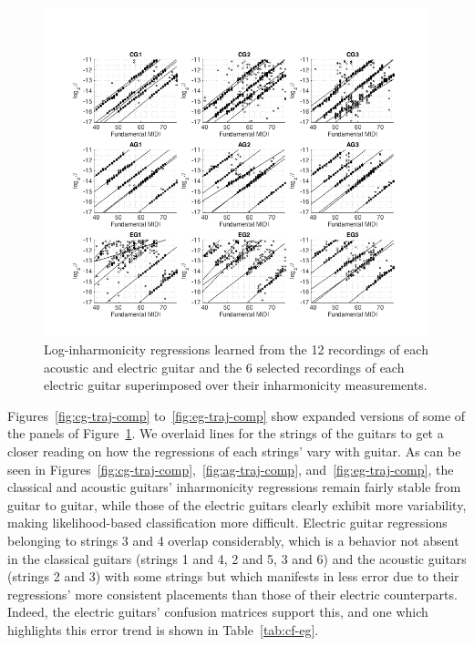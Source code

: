 \documentclass[12pt]{cmuthesis}
\begin{document}
\begin{figure}[!htbp] 
\centering
\includegraphics[scale=0.65]{regs3by3}
\caption{Log-inharmonicity regressions learned from the 12 recordings of each acoustic and electric guitar and the 6 selected recordings of each electric guitar superimposed over their inharmonicity measurements.}
\label{fig:regs3by3}
\end{figure}

Figures~\ref{fig:cg-traj-comp} to~\ref{fig:eg-traj-comp} show expanded versions of some of the panels of Figure~\ref{fig:regs3by3}. We overlaid lines for the strings of the guitars to get a closer reading on how the regressions of each strings' vary with guitar. As can be seen in Figures~\ref{fig:cg-traj-comp},~\ref{fig:ag-traj-comp}, and~\ref{fig:eg-traj-comp}, the classical and acoustic guitars' inharmonicity regressions remain fairly stable from guitar to guitar, while those of the electric guitars clearly exhibit more variability, making likelihood-based classification more difficult. Electric guitar regressions belonging to strings 3 and 4 overlap considerably, which is a behavior not absent in the classical guitars (strings 1 and 4, 2 and 5, 3 and 6) and the acoustic guitars (strings 2 and 3) with some strings but which manifests in less error due to their regressions' more consistent placements than those of their electric counterparts. Indeed, the electric guitars' confusion matrices support this, and one which highlights this error trend is shown in Table~\ref{tab:cf-eg}. 
\end{document}
